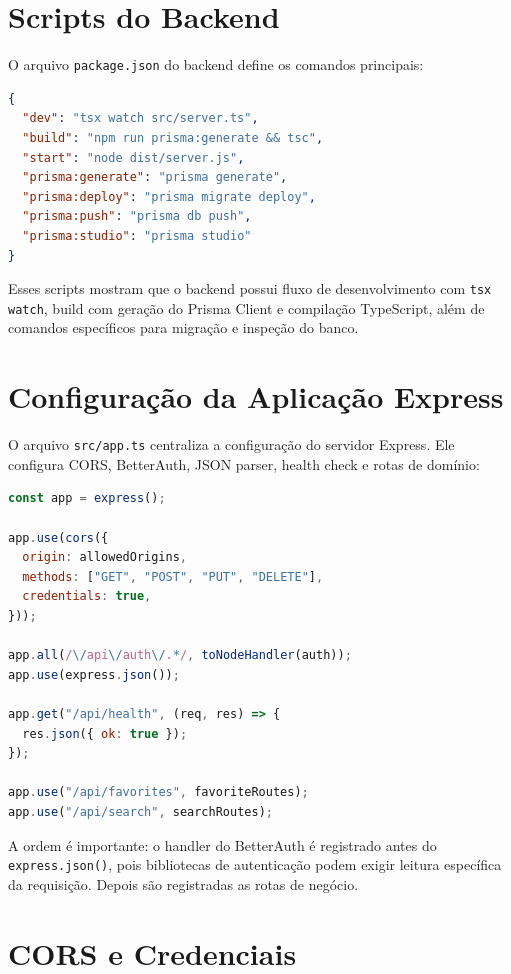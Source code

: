 \documentclass[
    12pt,
    oneside,
    openright,
    a4paper,
    english,
    brazil
]{abntex2}
\begin{document}
\section{Scripts do Backend}

O arquivo \texttt{package.json} do backend define os comandos principais:

\begin{lstlisting}[language=json, caption={Scripts principais do backend}]
{
  "dev": "tsx watch src/server.ts",
  "build": "npm run prisma:generate && tsc",
  "start": "node dist/server.js",
  "prisma:generate": "prisma generate",
  "prisma:deploy": "prisma migrate deploy",
  "prisma:push": "prisma db push",
  "prisma:studio": "prisma studio"
}
\end{lstlisting}

Esses scripts mostram que o backend possui fluxo de desenvolvimento com \texttt{tsx watch}, build com geração do Prisma Client e compilação TypeScript, além de comandos específicos para migração e inspeção do banco.

\section{Configuração da Aplicação Express}

O arquivo \texttt{src/app.ts} centraliza a configuração do servidor Express. Ele configura CORS, BetterAuth, JSON parser, health check e rotas de domínio:

\begin{lstlisting}[language=JavaScript, caption={Configuração resumida do Express}]
const app = express();

app.use(cors({
  origin: allowedOrigins,
  methods: ["GET", "POST", "PUT", "DELETE"],
  credentials: true,
}));

app.all(/\/api\/auth\/.*/, toNodeHandler(auth));
app.use(express.json());

app.get("/api/health", (req, res) => {
  res.json({ ok: true });
});

app.use("/api/favorites", favoriteRoutes);
app.use("/api/search", searchRoutes);
\end{lstlisting}

A ordem é importante: o handler do BetterAuth é registrado antes do \texttt{express.json()}, pois bibliotecas de autenticação podem exigir leitura específica da requisição. Depois são registradas as rotas de negócio.

\section{CORS e Credenciais}
\end{document}
